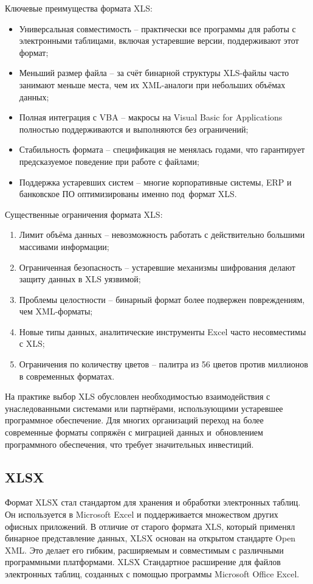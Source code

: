 \documentclass{ou}
\begin{document}
Ключевые преимущества формата XLS:
\begin{itemize}[label=-, leftmargin=0em, itemindent=3.35em, nosep]
\item Универсальная совместимость -- практически все программы для работы с электронными таблицами, включая устаревшие версии, поддерживают этот формат;
\item Меньший размер файла -- за счёт бинарной структуры XLS-файлы часто занимают меньше места, чем их XML-аналоги при небольших объёмах данных;
\item Полная интеграция с VBA -- макросы на Visual Basic for Applications полностью поддерживаются и выполняются без ограничений;
\item Стабильность формата -- спецификация не менялась годами, что гарантирует предсказуемое поведение при работе с файлами;
\item Поддержка устаревших систем -- многие корпоративные системы, ERP и банковское ПО оптимизированы именно под~формат XLS.
\end{itemize}

Существенные ограничения формата XLS:
\begin{enumerate}[leftmargin=0em, itemindent=3.75em, nosep, label=\arabic*)]
\item Лимит объёма данных -- невозможность работать с действительно большими массивами информации;
\item Ограниченная безопасность -- устаревшие механизмы шифрования делают защиту данных в XLS уязвимой;
\item Проблемы целостности -- бинарный формат более подвержен повреждениям, чем XML-форматы;
\item Новые типы данных, аналитические инструменты Excel часто несовместимы с XLS;
\item Ограничения по количеству цветов -- палитра из 56 цветов против миллионов в современных форматах.
\end{enumerate}

На практике выбор XLS обусловлен необходимостью взаимодействия с унаследованными системами или партнёрами, использующими устаревшее программное обеспечение. Для многих организаций переход на более современные форматы сопряжён с миграцией данных и~обновлением программного обеспечения, что требует значительных инвестиций.
\subsection{XLSX}
Формат XLSX стал стандартом для хранения и обработки электронных таблиц. Он используется в Microsoft Excel и поддерживается множеством других офисных приложений. В отличие от старого формата XLS, который применял бинарное представление данных, XLSX основан на открытом стандарте Open XML. Это делает его гибким, расширяемым и совместимым с различными программными платформами. XLSX Стандартное расширение для файлов электронных таблиц, созданных с помощью программы Microsoft Office Excel. 
\end{document}
